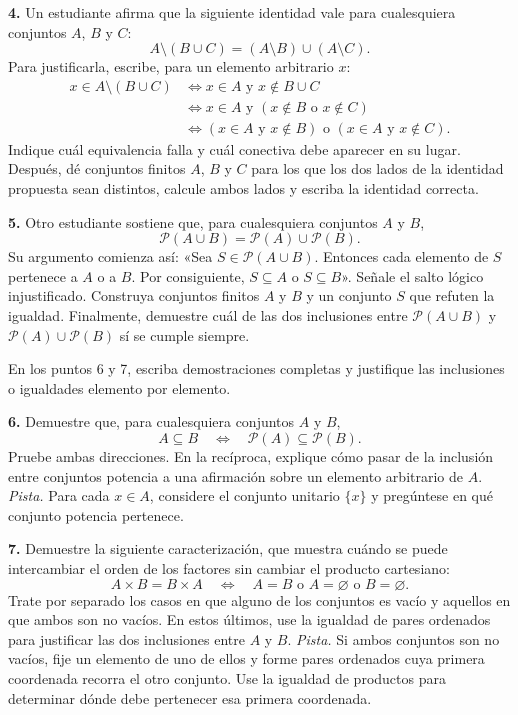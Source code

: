 \documentclass[11pt,a4paper]{article}
\newcommand{\PP}{\mathcal{P}}
\begin{document}
\noindent\textbf{4.} Un estudiante afirma que la siguiente identidad vale para cualesquiera conjuntos $A$, $B$ y $C$:
\[
A\setminus(B\cup C)=(A\setminus B)\cup(A\setminus C).
\]
Para justificarla, escribe, para un elemento arbitrario $x$:
\begin{align*}
x\in A\setminus(B\cup C)
&\Longleftrightarrow x\in A\text{ y }x\notin B\cup C\\
&\Longleftrightarrow x\in A\text{ y }(x\notin B\text{ o }x\notin C)\\
&\Longleftrightarrow (x\in A\text{ y }x\notin B)\text{ o }(x\in A\text{ y }x\notin C).
\end{align*}
Indique cuál equivalencia falla y cuál conectiva debe aparecer en su lugar. Después, dé conjuntos finitos $A$, $B$ y $C$ para los que los dos lados de la identidad propuesta sean distintos, calcule ambos lados y escriba la identidad correcta.

\noindent\textbf{5.} Otro estudiante sostiene que, para cualesquiera conjuntos $A$ y $B$,
\[
\PP(A\cup B)=\PP(A)\cup\PP(B).
\]
Su argumento comienza así: «Sea $S\in\PP(A\cup B)$. Entonces cada elemento de $S$ pertenece a $A$ o a $B$. Por consiguiente, $S\subseteq A$ o $S\subseteq B$».
Señale el salto lógico injustificado. Construya conjuntos finitos $A$ y $B$ y un conjunto $S$ que refuten la igualdad. Finalmente, demuestre cuál de las dos inclusiones entre $\PP(A\cup B)$ y $\PP(A)\cup\PP(B)$ sí se cumple siempre.

\noindent En los puntos 6 y 7, escriba demostraciones completas y justifique las inclusiones o igualdades elemento por elemento.

\noindent\textbf{6.} Demuestre que, para cualesquiera conjuntos $A$ y $B$,
\[
A\subseteq B\quad\Longleftrightarrow\quad\PP(A)\subseteq\PP(B).
\]
Pruebe ambas direcciones. En la recíproca, explique cómo pasar de la inclusión entre conjuntos potencia a una afirmación sobre un elemento arbitrario de $A$.
\emph{Pista.} Para cada $x\in A$, considere el conjunto unitario $\{x\}$ y pregúntese en qué conjunto potencia pertenece.

\noindent\textbf{7.} Demuestre la siguiente caracterización, que muestra cuándo se puede intercambiar el orden de los factores sin cambiar el producto cartesiano:
\[
A\times B=B\times A
\quad\Longleftrightarrow\quad
A=B\text{ o }A=\varnothing\text{ o }B=\varnothing.
\]
Trate por separado los casos en que alguno de los conjuntos es vacío y aquellos en que ambos son no vacíos. En estos últimos, use la igualdad de pares ordenados para justificar las dos inclusiones entre $A$ y $B$.
\emph{Pista.} Si ambos conjuntos son no vacíos, fije un elemento de uno de ellos y forme pares ordenados cuya primera coordenada recorra el otro conjunto. Use la igualdad de productos para determinar dónde debe pertenecer esa primera coordenada.
\end{document}
